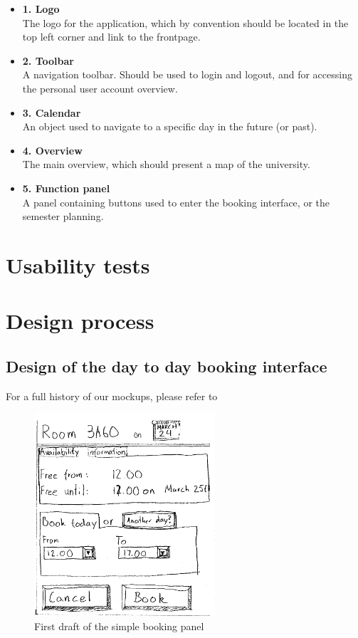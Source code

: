 \begin{itemize}
	\item \textbf{1. Logo}\\
	The logo for the application, which by convention should be located in the top left corner and link to the frontpage. \cite{steve}
	\item \textbf{2. Toolbar}\\
	A navigation toolbar. Should be used to login and logout, and for accessing the personal user account overview.
	\item \textbf{3. Calendar}\\
	An object used to navigate to a specific day in the future (or past).
	\item \textbf{4. Overview}\\
	The main overview, which should present a map of the university.
	\item \textbf{5. Function panel}\\
	A panel containing buttons used to enter the booking interface, or the semester planning.
\end{itemize}

\section{Usability tests} %
\label{sec:usability_tests}



\section{Design process}
\label{sec:design_process}

\subsection{Design of the day to day booking interface}
For a full history of our mockups, please refer to %

\begin{figure}[htb]
\begin{center}
\leavevmode
\includegraphics[width=0.6\textwidth]{images/bookRoomMockup}
\end{center}
\caption{First draft of the simple booking panel}
\label{fig:book_room_mockup}
\end{figure}

